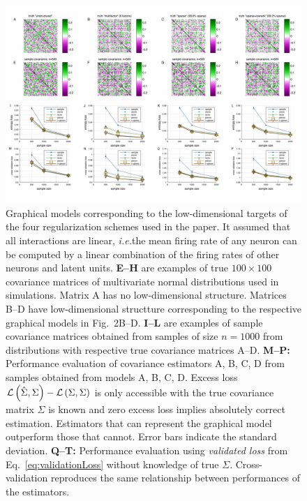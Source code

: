\begin{figure}[htp]
\centering
\includegraphics[width=1.0\textwidth]{figures/Figure3.pdf}
\caption{
Graphical models corresponding to the low-dimensional targets of the four regularization schemes used in the paper. It assumed that all interactions are linear, \emph{i.e.}\;the mean firing rate of any neuron can be computed by a linear combination of the firing rates of other neurons and latent units.
{\bf E--H} are examples of true $100\times100$ covariance matrices of multivariate normal distributions used in simulations. Matrix A has no low-dimensional structure. Matrices B--D have low-dimensional structture corresponding to the respective graphical models in Fig.~2B--D.
{\bf I--L} are examples of sample covariance matrices obtained from samples of size $n=1000$ from distributions with respective true covariance matrices A--D.
{\bf M--P:} Performance evaluation of covariance estimators A, B, C, D from samples obtained from models A, B, C, D.  Excess loss $\mathcal L\left(\hat\Sigma,\Sigma\right)-\mathcal L\left(\Sigma,\Sigma\right)$ is only accessible with the true covariance matrix $\Sigma$ is known and zero excess loss implies absolutely correct estimation. Estimators that can represent the graphical model outperform those that cannot.  Error bars indicate the standard deviation. 
{\bf Q--T:} Performance evaluation using \emph{validated loss} from Eq.~\ref{eq:validationLoss} without knowledge of true $\Sigma$. Cross-validation reproduces the same relationship between performances of the estimators.
}\label{fig:03}
\end{figure}
